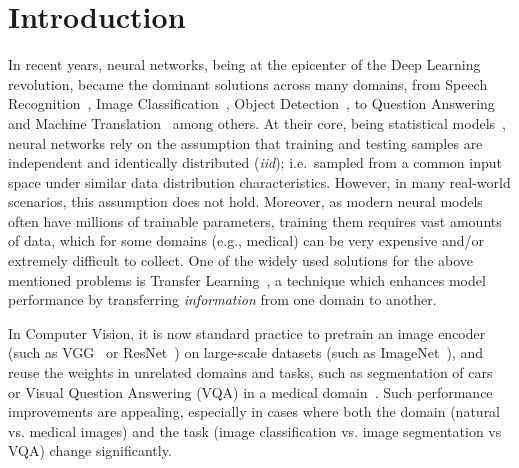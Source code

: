 \section{Introduction}
In recent years, neural networks, being at the epicenter of the Deep Learning~\cite{lecun2015deep} revolution, became the dominant solutions across many domains, from Speech Recognition~\cite{graves2013speech}, Image Classification~\cite{krizhevsky2012imagenet}, Object Detection~\cite{redmon2016you}, to Question Answering~\cite{weston2014memory} and Machine Translation~\cite{bahdanau2014neural} among others.
At their core, being statistical models~\cite{ripley1993statistical,warner1996understanding}, neural networks rely on the assumption that training and testing samples are independent and identically distributed (\textit{iid}); i.e.\ sampled from a common input space under similar data distribution characteristics.
However, in many real-world scenarios, this assumption does not hold. Moreover, as modern neural models often have millions of trainable parameters, training them requires vast amounts of data, which for some domains (e.g., medical) can be very expensive and/or extremely difficult to collect.
One of the widely used solutions for the above mentioned problems is Transfer Learning~\cite{pan2009survey,weiss2016survey}, a technique which enhances model performance by transferring \emph{information} from one domain to another.


In Computer Vision, it is now standard practice to pretrain an image encoder (such as VGG~\cite{simonyan2014very} or ResNet~\cite{he2016deep}) on large-scale datasets (such as ImageNet~\cite{deng2009imagenet}), and reuse the weights in unrelated domains and tasks, such as segmentation of cars~\cite{iglovikov2018ternausnet} or Visual Question Answering (VQA) in a medical domain~\cite{kornuta2019leveraging}.
Such performance improvements are appealing, especially in cases where both the domain (natural vs. medical images) and the task (image classification vs. image segmentation vs VQA) change significantly. %

